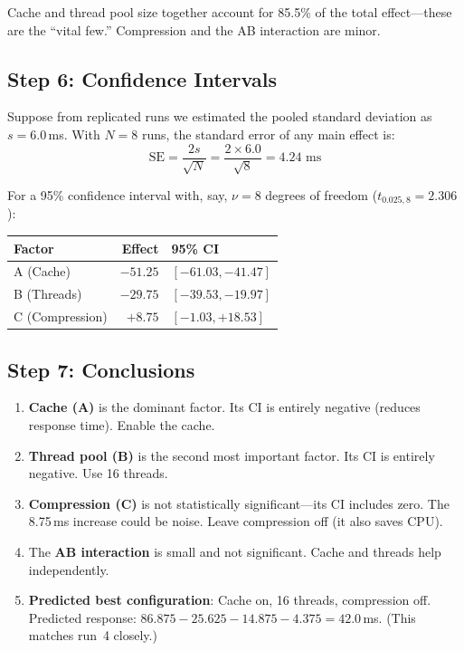 \documentclass[11pt]{book}
\begin{document}
Cache and thread pool size together account for 85.5\% of the total effect---these
are the ``vital few.'' Compression and the AB interaction are minor.

\subsection{Step 6: Confidence Intervals}

Suppose from replicated runs we estimated the pooled standard deviation as
$s = 6.0$\,ms. With $N = 8$ runs, the standard error of any main effect is:
\[
\text{SE} = \frac{2s}{\sqrt{N}} = \frac{2 \times 6.0}{\sqrt{8}} = 4.24 \text{ ms}
\]

For a 95\% confidence interval with, say, $\nu = 8$ degrees of freedom
($t_{0.025, 8} = 2.306$):

\begin{center}
\begin{tabular}{lrl}
\toprule
Factor & Effect & 95\% CI \\
\midrule
A (Cache) & $-51.25$ & $[-61.03, -41.47]$ \\
B (Threads) & $-29.75$ & $[-39.53, -19.97]$ \\
C (Compression) & $+8.75$ & $[-1.03, +18.53]$ \\
\bottomrule
\end{tabular}
\end{center}

\subsection{Step 7: Conclusions}

\begin{enumerate}[nosep]
\item \textbf{Cache (A)} is the dominant factor. Its CI is entirely negative
      (reduces response time). Enable the cache.
\item \textbf{Thread pool (B)} is the second most important factor. Its CI is
      entirely negative. Use 16 threads.
\item \textbf{Compression (C)} is not statistically significant---its CI
      includes zero. The 8.75\,ms increase could be noise. Leave compression off
      (it also saves CPU).
\item The \textbf{AB interaction} is small and not significant. Cache and threads
      help independently.
\item \textbf{Predicted best configuration}: Cache on, 16 threads, compression
      off. Predicted response: $86.875 - 25.625 - 14.875 - 4.375 = 42.0$\,ms.
      (This matches run~4 closely.)
\end{enumerate}
\end{document}
